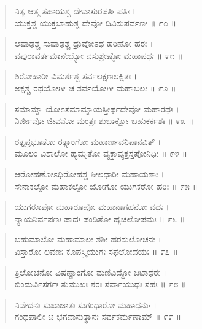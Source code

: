 \begin{verse}
ನಿತ್ಯ ಆತ್ಮ ಸಹಾಯಶ್ಚ ದೇವಾಸುರಪತಿಃ ಪತಿಃ ।\\ಯುಕ್ತಶ್ಚ ಯುಕ್ತಬಾಹುಶ್ಚ ದೇವೋ ದಿವಿಸುಪರ್ವಣಃ \num{॥ ೯೦ ॥}
\end{verse}

\begin{verse}
ಆಷಾಢಶ್ಚ ಸುಷಾಢಶ್ಚ ಧ್ರುವೋಽಥ ಹರಿಣೋ ಹರಃ ।\\ವಪುರಾವರ್ತಮಾನೇಭ್ಯೋ ವಸುಶ್ರೇಷ್ಠೋ ಮಹಾಪಥಃ \num{॥ ೯೧ ॥}
\end{verse}

\begin{verse}
ಶಿರೋಹಾರೀ ವಿಮರ್ಶಶ್ಚ ಸರ್ವಲಕ್ಷಣಲಕ್ಷಿತಃ ।\\ಅಕ್ಷಶ್ಚ ರಥಯೋಗೀ ಚ ಸರ್ವಯೋಗೀ ಮಹಾಬಲಃ \num{॥ ೯೨ ॥}
\end{verse}

\begin{verse}
ಸಮಾಮ್ನಾ ಯೋಽಸಮಾಮ್ನಾಯಸ್ತೀರ್ಥದೇವೋ ಮಹಾರಥಃ ।\\ನಿರ್ಜೀವೋ ಜೀವನೋ ಮಂತ್ರಃ ಶುಭಾಕ್ಷೋ ಬಹುಕರ್ಕಶಃ \num{॥ ೯೩ ॥}
\end{verse}

\begin{verse}
ರತ್ನಪ್ರಭೂತೋ ರತ್ನಾಂಗೋ ಮಹಾರ್ಣವನಿಪಾನವಿತ್ ।\\ಮೂಲಂ ವಿಶಾಲೋ ಹ್ಯಮೃತೋ ವ್ಯಕ್ತಾವ್ಯಕ್ತಸ್ತಪೋನಿಧಿಃ \num{॥ ೯೪ ॥}
\end{verse}

\begin{verse}
ಆರೋಹಣೋಽಧಿರೋಹಶ್ಚ ಶೀಲಧಾರೀ ಮಹಾಯಶಾಃ ।\\ಸೇನಾಕಲ್ಪೋ ಮಹಾಕಲ್ಪೋ ಯೋಗೋ ಯುಗಕರೋ ಹರಿಃ \num{॥ ೯೫ ॥}
\end{verse}

\begin{verse}
ಯುಗರೂಪೋ ಮಹಾರೂಪೋ ಮಹಾನಾಗಹನೋ ವಧಃ ।\\ನ್ಯಾಯನಿರ್ವಪಣಃ ಪಾದಃ ಪಂಡಿತೋ ಹ್ಯಚಲೋಪಮಃ \num{॥ ೯೬ ॥}
\end{verse}

\begin{verse}
ಬಹುಮಾಲೋ ಮಹಾಮಾಲಃ ಶಶೀ ಹರಸುಲೋಚನಃ ।\\ವಿಸ್ತಾರೋ ಲವಣಃ ಕೂಪಸ್ತ್ರಿಯುಗಃ ಸಫಲೋದಯಃ \num{॥ ೯೭ ॥}
\end{verse}

\begin{verse}
ತ್ರಿಲೋಚನೋ ವಿಷಣ್ಣಾಂಗೋ ಮಣಿವಿದ್ಧೋ ಜಟಾಧರಃ ।\\ಬಿಂದುರ್ವಿಸರ್ಗಃ ಸುಮುಖಃ ಶರಃ ಸರ್ವಾಯುಧಃ ಸಹಃ \num{॥ ೯೮ ॥}
\end{verse}

\begin{verse}
ನಿವೇದನಃ ಸುಖಾಜಾತಃ ಸುಗಂಧಾರೋ ಮಹಾಧನುಃ ।\\ಗಂಧಪಾಲೀ ಚ ಭಗವಾನುತ್ಥಾನಃ ಸರ್ವಕರ್ಮಣಾಮ್ \num{॥ ೯೯ ॥}
\end{verse}

